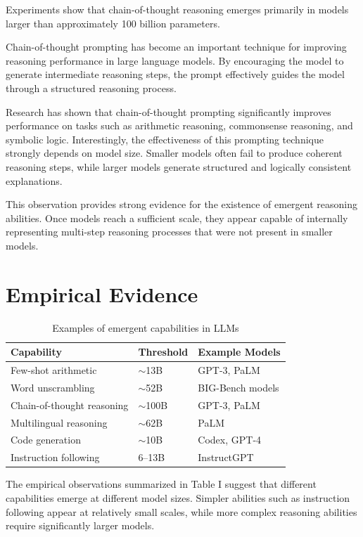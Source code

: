 \documentclass[conference]{IEEEtran}
\begin{document}
Experiments show that chain-of-thought reasoning emerges primarily in models larger than approximately 100 billion parameters.

Chain-of-thought prompting has become an important technique for improving reasoning performance in large language models. By encouraging the model to generate intermediate reasoning steps, the prompt effectively guides the model through a structured reasoning process.

Research has shown that chain-of-thought prompting significantly improves performance on tasks such as arithmetic reasoning, commonsense reasoning, and symbolic logic. Interestingly, the effectiveness of this prompting technique strongly depends on model size. Smaller models often fail to produce coherent reasoning steps, while larger models generate structured and logically consistent explanations.

This observation provides strong evidence for the existence of emergent reasoning abilities. Once models reach a sufficient scale, they appear capable of internally representing multi-step reasoning processes that were not present in smaller models.

\section{Empirical Evidence}

\begin{table}[h]
\centering
\begin{tabular}{lll}
\toprule
Capability & Threshold & Example Models \\
\midrule
Few-shot arithmetic & $\sim$13B & GPT-3, PaLM \\
Word unscrambling & $\sim$52B & BIG-Bench models \\
Chain-of-thought reasoning & $\sim$100B & GPT-3, PaLM \\
Multilingual reasoning & $\sim$62B & PaLM \\
Code generation & $\sim$10B & Codex, GPT-4 \\
Instruction following & 6--13B & InstructGPT \\
\bottomrule
\end{tabular}
\caption{Examples of emergent capabilities in LLMs}
\end{table}
The empirical observations summarized in Table I suggest that different capabilities emerge at different model sizes. Simpler abilities such as instruction following appear at relatively small scales, while more complex reasoning abilities require significantly larger models.
\end{document}
